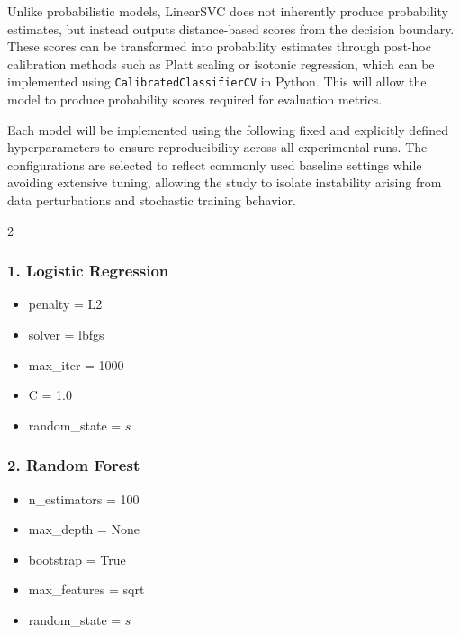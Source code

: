 \documentclass[12pt]{article}
\begin{document}
\begin{enumerate}
    Unlike probabilistic models, LinearSVC does not inherently produce probability estimates, but instead outputs distance-based scores from the decision boundary. These scores can be transformed into probability estimates through post-hoc calibration methods such as Platt scaling or isotonic regression, which can be implemented using \texttt{CalibratedClassifierCV} in Python. This will allow the model to produce probability scores required for evaluation metrics.
\end{enumerate}

Each model will be implemented using the following fixed and explicitly defined hyperparameters to ensure reproducibility across all experimental runs. The configurations are selected to reflect commonly used baseline settings while avoiding extensive tuning, allowing the study to isolate instability arising from data perturbations and stochastic training behavior.

\begin{multicols}{2}
  \subsubsection*{1. Logistic Regression}
  \begin{itemize}
    \item penalty = L2
    \item solver = lbfgs
    \item max\_iter = 1000
    \item C = 1.0
    \item random\_state = $s$
  \end{itemize}
\columnbreak
  \subsubsection*{2. Random Forest}
  \begin{itemize}
    \item n\_estimators = 100
    \item max\_depth = None
    \item bootstrap = True
    \item max\_features = sqrt
    \item random\_state = $s$
  \end{itemize}
\end{multicols}
\end{document}
